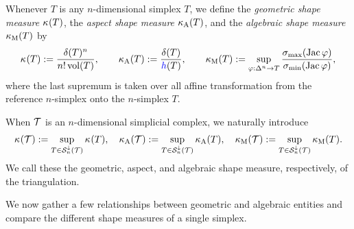 \documentclass[10pt,a4paper]{article}
\begin{document}
Whenever $T$ is any $n$-dimensional simplex $T$,
we define the \textit{geometric shape measure} $\kappa_{}(T)$,
the \textit{aspect shape measure} $\kappa_{\rm A}(T)$,
and 
the \textit{algebraic shape measure} $\kappa_{\rm M}(T)$
by 
\begin{align}\label{math:shapemeasure}
    \geometricshapemeasure(T)
    := 
    \frac{ \diam(T)^{n} }{ n! \vol(T) }
    ,
    \qquad 
    \aspectratio(T)
    := 
    \frac{ \diam(T) }{ \height(T) }
    ,
    \qquad 
    \algebraicshapemeasure(T)
    := 
    \sup_{ \varphi : \Delta^n \rightarrow T } 
    \frac{ \sigma_{\max}( \Jacobian \varphi ) }{ \sigma_{\min}( \Jacobian \varphi ) }
    ,
\end{align}
where the last supremum is taken over all affine transformation from the reference $n$-simplex onto the $n$-simplex $T$. 

When ${\mathcal T}$ is an $n$-dimensional simplicial complex, we naturally introduce 
\begin{align}\label{math:shapemeasure:triangulation}
    \kappa_{}({\mathcal T}) := \sup_{ T \in {\mathcal S}^{\downarrow}_{n}({\mathcal T}) } \kappa_{}(T)
    ,
    \quad 
    \kappa_{\rm A}({\mathcal T}) := \sup_{ T \in {\mathcal S}^{\downarrow}_{n}({\mathcal T}) } \kappa_{\rm A}(T)
    ,
    \quad 
    \kappa_{\rm M}({\mathcal T}) := \sup_{ T \in {\mathcal S}^{\downarrow}_{n}({\mathcal T}) } \kappa_{\rm M}(T)
    .
\end{align}
We call these the geometric, aspect, and algebraic shape measure, respectively, of the triangulation. 

We now gather a few relationships between geometric and algebraic entities and compare the different shape measures of a single simplex.
\end{document}
